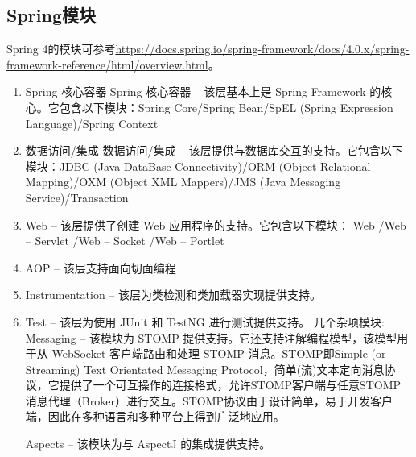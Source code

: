 \documentclass[../../../interview-questions.tex]{subfiles}
\begin{document}
\subsection{Spring模块}

Spring 4的模块可参考\url{https://docs.spring.io/spring-framework/docs/4.0.x/spring-framework-reference/html/overview.html}。

\begin{enumerate}
    \item {Spring 核心容器}
Spring 核心容器 – 该层基本上是 Spring Framework 的核心。它包含以下模块：Spring Core/Spring Bean/SpEL (Spring Expression Language)/Spring Context
    \item{数据访问/集成}
数据访问/集成 – 该层提供与数据库交互的支持。它包含以下模块：JDBC (Java DataBase Connectivity)/ORM (Object Relational Mapping)/OXM (Object XML Mappers)/JMS (Java Messaging Service)/Transaction
\item{Web – 该层提供了创建 Web 应用程序的支持。}它包含以下模块：
Web
/Web – Servlet
/Web – Socket
/Web – Portlet
\item{AOP – 该层支持面向切面编程}
\item{Instrumentation – 该层为类检测和类加载器实现提供支持。}
\item{Test – 该层为使用 JUnit 和 TestNG 进行测试提供支持。}
几个杂项模块:
Messaging – 该模块为 STOMP 提供支持。它还支持注解编程模型，该模型用于从 WebSocket 客户端路由和处理 STOMP 消息。STOMP即Simple (or Streaming) Text Orientated Messaging Protocol，简单(流)文本定向消息协议，它提供了一个可互操作的连接格式，允许STOMP客户端与任意STOMP消息代理（Broker）进行交互。STOMP协议由于设计简单，易于开发客户端，因此在多种语言和多种平台上得到广泛地应用。

Aspects – 该模块为与 AspectJ 的集成提供支持。
\end{enumerate}
\end{document}
